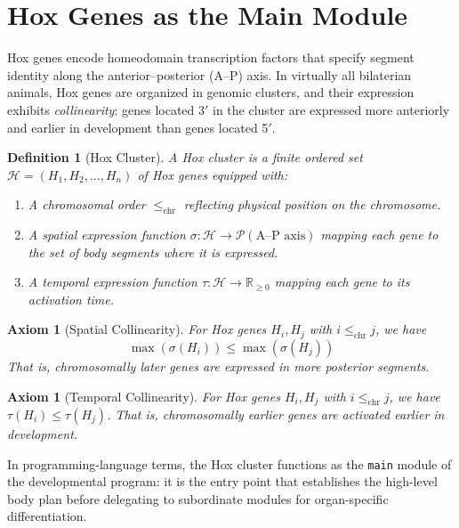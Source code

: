 \documentclass[12pt,a4paper]{article}
\newtheorem{definition}[theorem]{Definition}
\newtheorem{axiom}[theorem]{Axiom}
\begin{document}
\section{Hox Genes as the Main Module}\label{sec:hox}

Hox genes encode homeodomain transcription factors that specify segment
identity along the anterior--posterior (A--P) axis.  In virtually all
bilaterian animals, Hox genes are organized in genomic clusters, and
their expression exhibits \emph{collinearity}: genes located 3$'$ in
the cluster are expressed more anteriorly and earlier in development
than genes located 5$'$.

\begin{definition}[Hox Cluster]\label{def:hox-cluster}
A \emph{Hox cluster} is a finite ordered set
$\mathcal{H} = (H_1, H_2, \ldots, H_n)$ of Hox genes equipped with:
\begin{enumerate}
  \item A \emph{chromosomal order} $\leq_{\text{chr}}$ reflecting
    physical position on the chromosome.
  \item A \emph{spatial expression function}
    $\sigma : \mathcal{H} \to \mathcal{P}(\text{A--P axis})$ mapping
    each gene to the set of body segments where it is expressed.
  \item A \emph{temporal expression function}
    $\tau : \mathcal{H} \to \mathbb{R}_{\geq 0}$ mapping each gene
    to its activation time.
\end{enumerate}
\end{definition}

\begin{axiom}[Spatial Collinearity]\label{ax:spatial-col}
For Hox genes $H_i, H_j$ with $i \leq_{\text{chr}} j$, we have
\[
  \max(\sigma(H_i)) \leq \max(\sigma(H_j))
\]
That is, chromosomally later genes are expressed in more posterior
segments.
\end{axiom}

\begin{axiom}[Temporal Collinearity]\label{ax:temporal-col}
For Hox genes $H_i, H_j$ with $i \leq_{\text{chr}} j$, we have
$\tau(H_i) \leq \tau(H_j)$.
That is, chromosomally earlier genes are activated earlier in
development.
\end{axiom}

In programming-language terms, the Hox cluster functions as the
\texttt{main} module of the developmental program: it is the
entry point that establishes the high-level body plan before
delegating to subordinate modules for organ-specific differentiation.
\end{document}
